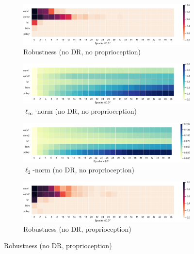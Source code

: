\begin{figure}[h!]
  \centering
  \begin{subfigure}{0.32\textwidth}
    \includegraphics[width=\textwidth]{figures/chapter6/robustness/fetch/visual_std/error}
    \caption{Robustness (no DR, no proprioception)}
  \end{subfigure}
  \begin{subfigure}{0.32\textwidth}
    \includegraphics[width=\textwidth]{figures/chapter6/robustness/fetch/visual_std/inf_dist}
    \caption{$\ell_\infty$-norm (no DR, no proprioception)}
  \end{subfigure}
  \begin{subfigure}{0.32\textwidth}
    \includegraphics[width=\textwidth]{figures/chapter6/robustness/fetch/visual_std/l2_dist}
    \caption{$\ell_2$-norm (no DR, no proprioception)}
  \end{subfigure}
  \begin{subfigure}{0.32\textwidth}
    \includegraphics[width=\textwidth]{figures/chapter6/robustness/fetch/sensor_std/error}
    \caption{Robustness (no DR, proprioception)}
  \end{subfigure}

\end{figure}
